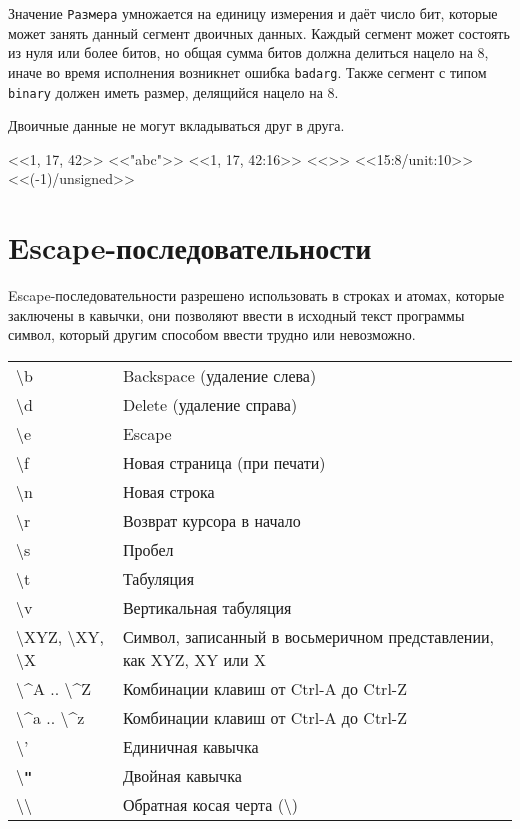 Значение \texttt{Размера} умножается на единицу измерения и даёт число бит, 
которые может занять данный сегмент двоичных данных. Каждый сегмент может
состоять из нуля или более битов, но общая сумма битов должна делиться нацело
на 8, иначе во время  исполнения возникнет ошибка \texttt{badarg}. Также
сегмент с типом \texttt{binary} должен иметь размер, делящийся нацело на 8.

Двоичные данные не могут вкладываться друг в друга.

\begin{erlang}
<<1, 17, 42>>       %
<<"abc">>           %
<<1, 17, 42:16>>    %
<<>>                %
<<15:8/unit:10>>    %
<<(-1)/unsigned>>   %
\end{erlang}


\section{Escape-последовательности}
\label{datatypes:escapeseq}

Escape-последовательности разрешено использовать в строках и атомах, которые 
заключены в кавычки, они позволяют ввести в исходный текст программы символ,
который другим способом ввести трудно или невозможно.

\begin{center}
\begin{tabular}{|>{\raggedright}p{90pt}|>{\raggedright}p{280pt}|}
\hline
\multicolumn{2}{|p{321pt}|}{Escape-последовательности}\tabularnewline
\hline
\textbackslash{}b & Backspace (удаление слева)\tabularnewline
\hline
\textbackslash{}d & Delete (удаление справа)\tabularnewline
\hline
\textbackslash{}e & Escape\tabularnewline
\hline
\textbackslash{}f & Новая страница (при печати)\tabularnewline
\hline
\textbackslash{}n & Новая строка\tabularnewline
\hline
\textbackslash{}r & Возврат курсора в начало\tabularnewline
\hline
\textbackslash{}s & Пробел\tabularnewline
\hline
\textbackslash{}t & Табуляция\tabularnewline
\hline
\textbackslash{}v & Вертикальная табуляция\tabularnewline
\hline
\textbackslash{}XYZ, \textbackslash{}XY, \textbackslash{}X &
Символ, записанный в восьмеричном представлении, как XYZ, XY или X\tabularnewline
\hline
\textbackslash{}\textasciicircum{}A .. \textbackslash{}\textasciicircum{}Z & 
Комбинации клавиш от Ctrl-A до Ctrl-Z\tabularnewline
\hline
\textbackslash{}\textasciicircum{}a .. \textbackslash{}\textasciicircum{}z &
Комбинации клавиш от Ctrl-A до Ctrl-Z\tabularnewline
\hline
\textbackslash{}' & Единичная кавычка \tabularnewline
\hline
\textbackslash{}\textbf{\texttt{"}} & Двойная кавычка \tabularnewline
\hline
\textbackslash{}\textbackslash{} & Обратная косая черта (\textbackslash) 
\tabularnewline
\hline
\end{tabular}
\end{center}


